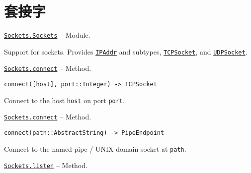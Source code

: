 \hypertarget{16962550433784269272}{}


\chapter{套接字}


\hypertarget{16889258743067172297}{} 
\hyperlink{16889258743067172297}{\texttt{Sockets.Sockets}}  -- {Module.}

\begin{adjustwidth}{2em}{0pt}

Support for sockets. Provides \hyperlink{8098410990676145612}{\texttt{IPAddr}} and subtypes, \hyperlink{5453047654537213204}{\texttt{TCPSocket}}, and \hyperlink{5627851531738059255}{\texttt{UDPSocket}}.



\end{adjustwidth}
\hypertarget{9905777280350118583}{} 
\hyperlink{9905777280350118583}{\texttt{Sockets.connect}}  -- {Method.}

\begin{adjustwidth}{2em}{0pt}


\begin{verbatim}
connect([host], port::Integer) -> TCPSocket
\end{verbatim}

Connect to the host \texttt{host} on port \texttt{port}.



\end{adjustwidth}
\hypertarget{15285016070454152057}{} 
\hyperlink{15285016070454152057}{\texttt{Sockets.connect}}  -- {Method.}

\begin{adjustwidth}{2em}{0pt}


\begin{verbatim}
connect(path::AbstractString) -> PipeEndpoint
\end{verbatim}

Connect to the named pipe / UNIX domain socket at \texttt{path}.



\end{adjustwidth}
\hypertarget{780704944207038170}{} 
\hyperlink{780704944207038170}{\texttt{Sockets.listen}}  -- {Method.}

